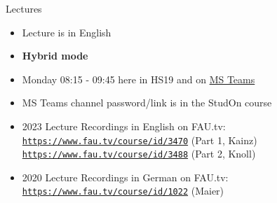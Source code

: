 \begin{frame}
\begin{columns}[c, onlytextwidth]
\begin{column}{0.3\textwidth}
		\end{column}
	\end{columns}
\end{frame}

\begin{frame}[c]{Lectures}
	\begin{itemize}
		\setlength\itemsep{0.4cm}
		\item Lecture is in English
		\item \textbf{Hybrid mode}
		\item Monday 08:15 - 09:45 here in HS19 and on \href{https://teams.microsoft.com/l/team/19\%3adRCxup9jUsjM31xr9T4jdAFDB-ImEk_lU5Fy05ijYx81\%40thread.tacv2/conversations?groupId=6b2df36b-cec0-46b3-83d2-b4e6d1c6ac30\&tenantId=b2efcef3-8496-40b8-9de8-f135982f3461}{MS Teams}
		\item MS Teams channel password/link is in the StudOn course
		\item 2023 Lecture Recordings in English on FAU.tv:\\
		\texttt{\url{https://www.fau.tv/course/id/3470}} (Part 1, Kainz)\\
		\texttt{\url{https://www.fau.tv/course/id/3488}} (Part 2, Knoll)
		\item 2020 Lecture Recordings in German on FAU.tv:\\
		\texttt{\url{https://www.fau.tv/course/id/1022}} (Maier)
	\end{itemize}
\end{frame}

